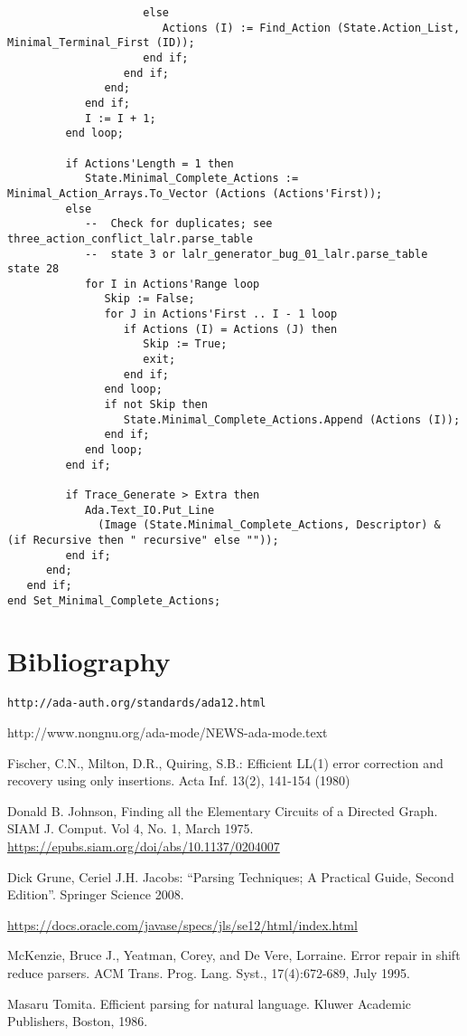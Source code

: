 \documentclass{article}
\begin{document}
\begin{lstlisting}
                     else
                        Actions (I) := Find_Action (State.Action_List, Minimal_Terminal_First (ID));
                     end if;
                  end if;
               end;
            end if;
            I := I + 1;
         end loop;

         if Actions'Length = 1 then
            State.Minimal_Complete_Actions := Minimal_Action_Arrays.To_Vector (Actions (Actions'First));
         else
            --  Check for duplicates; see three_action_conflict_lalr.parse_table
            --  state 3 or lalr_generator_bug_01_lalr.parse_table state 28
            for I in Actions'Range loop
               Skip := False;
               for J in Actions'First .. I - 1 loop
                  if Actions (I) = Actions (J) then
                     Skip := True;
                     exit;
                  end if;
               end loop;
               if not Skip then
                  State.Minimal_Complete_Actions.Append (Actions (I));
               end if;
            end loop;
         end if;

         if Trace_Generate > Extra then
            Ada.Text_IO.Put_Line
              (Image (State.Minimal_Complete_Actions, Descriptor) & (if Recursive then " recursive" else ""));
         end if;
      end;
   end if;
end Set_Minimal_Complete_Actions;

\end{lstlisting}
\section{Bibliography}
\begin{thebibliography}{9}

 \verb|http://ada-auth.org/standards/ada12.html|

 http://www.nongnu.org/ada-mode/NEWS-ada-mode.text

  Fischer, C.N., Milton, D.R., Quiring, S.B.:
  Efficient LL(1) error correction and recovery using only insertions.
  Acta Inf. 13(2), 141-154 (1980)

 Donald B. Johnson, Finding all the Elementary Circuits of a Directed Graph.
SIAM J. Comput. Vol 4, No. 1, March 1975. \url{https://epubs.siam.org/doi/abs/10.1137/0204007}

 Dick Grune, Ceriel J.H. Jacobs: ``Parsing Techniques; A Practical Guide, Second
  Edition''. Springer Science  2008.

  \url{https://docs.oracle.com/javase/specs/jls/se12/html/index.html}

 McKenzie, Bruce J., Yeatman, Corey, and De
  Vere, Lorraine. Error repair in shift reduce parsers. ACM Trans.
  Prog. Lang. Syst., 17(4):672-689, July 1995.

 Masaru Tomita. Efficient parsing for natural language. Kluwer Academic Publishers, Boston, 1986.
\end{thebibliography}
\end{document}
